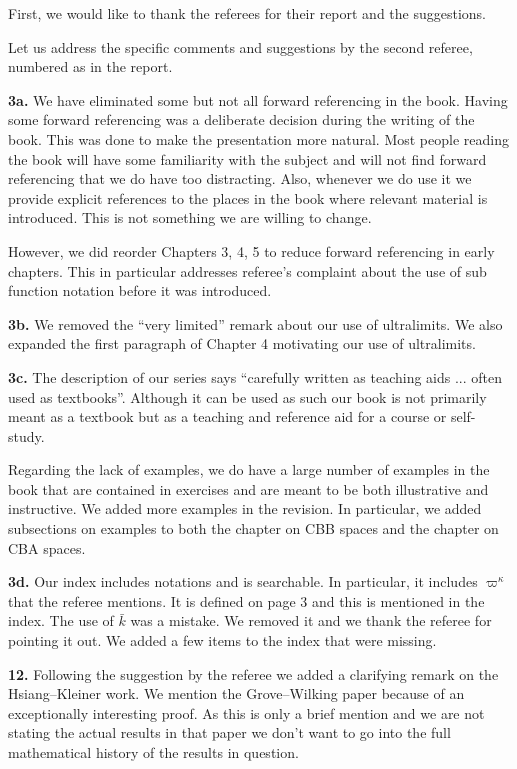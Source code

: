\documentclass[11pt]{amsart}
\begin{document}
First, we would like to thank the referees for their report and the suggestions.

Let us address the specific comments and suggestions by the second referee, numbered as in the report.

\medskip

{\bf 3a.} 
We have eliminated some but not all forward referencing in the book.
Having some forward referencing was a deliberate decision during the writing of the book. This was done to make the presentation more natural. Most people reading the book will have some familiarity with the subject and will not find forward referencing that we do have
too distracting.
Also, whenever we do use it we provide explicit references to the places in the book where relevant material is introduced.
This is not something we are willing to change.

However, we did reorder Chapters 3, 4, 5 to reduce forward referencing in early chapters.
This in particular addresses referee's complaint about the use of sub function notation before it was introduced.

\medskip

{\bf 3b.} 
We removed the ``very limited'' remark about our use of ultralimits. We also expanded the first paragraph of Chapter 4 motivating our use of ultralimits. 

\medskip

{\bf 3c.}
The description of our series says ``carefully written as teaching aids ... often used as textbooks''.  Although it can be used as such our book is not primarily meant as a textbook but as a teaching and reference aid for a course or self-study.

Regarding the lack of examples, we do have a large number of examples in the book that are contained in exercises and are meant to be both illustrative and instructive.
We added  more examples in the revision.
In particular, we added subsections on examples to both the chapter on CBB spaces and the chapter on CBA spaces.

\medskip

{\bf 3d. }
Our index includes notations and is searchable.
In particular, it includes $\varpi^\kappa$ that the referee mentions. It is defined on page 3 and this is mentioned in the index.
The use of $\bar k$ was a mistake.
We removed it and we thank the referee for pointing it out.
We added a few  items to the index that were missing. 

\medskip

{\bf 12.}
Following the suggestion by the referee we added a clarifying remark on the Hsiang--Kleiner work.
We mention the Grove--Wilking paper because of an exceptionally interesting proof. As this is only a brief mention and we are not stating the actual results in that paper we don't want to go into the full mathematical history of the results in question.
\end{document}
